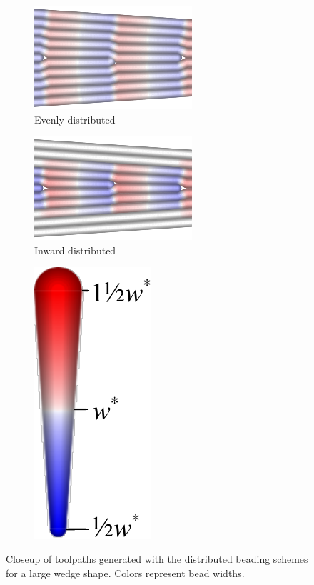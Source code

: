 \begin{figure}
\centering
\setlength{\figwidth}{.4\columnwidth}
\setlength{\figheight}{.25\columnwidth}
\begin{subfigure}[t]{\figwidth}\centering
\includegraphics[height=\figheight,frame]{sources-validation-wedge-Distributed-pretty-evenly.png}
\caption{Evenly distributed}
\end{subfigure}
\begin{subfigure}[t]{\figwidth}\centering
\includegraphics[height=\figheight,frame]{sources-validation-wedge-Distributed-pretty-inward.png}
\caption{Inward distributed}
\end{subfigure}
\begin{subfigure}[t]{.1\columnwidth}\centering
\includegraphics[height=\figheight]{sources-validation-widths-legend-small.pdf}
\end{subfigure}
\caption{
Closeup of toolpaths generated with the distributed beading schemes for a large wedge shape.
Colors represent bead widths.
}
\label{distributed_comparison}
\end{figure}








